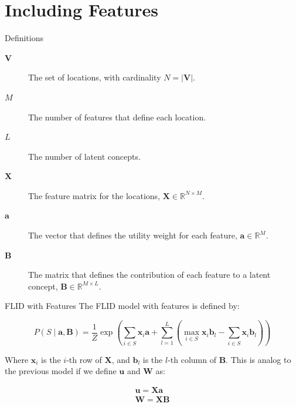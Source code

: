 \documentclass{beamer}
\begin{document}
  \section{Including Features}
  
  \begin{frame}{Definitions}
    \begin{description}
      \item[$\bm{V}$] The set of locations, with cardinality $N = \lvert \bm{V} \rvert$.
      \item[$M$] The number of features that define each location.
      \item[$L$] The number of latent concepts.
      \item[$\bm{X}$] The feature matrix for the locations, $\bm{X} \in \mathbb{R}^{N \times M}$.
      \item[$\bm{a}$] The vector that defines the utility weight for each feature, $\bm{a} \in \mathbb{R}^{M}$.
      \item[$\bm{B}$] The matrix that defines the contribution of each feature to a latent concept, $\bm{B} \in \mathbb{R}^{M \times L}$.
    \end{description}
  \end{frame}
  
  \begin{frame}{FLID with Features}
    The FLID model with features is defined by:
    
    \begin{equation}
      P(S \mid \bm{a}, \bm{B}) = \frac{1}{Z} \exp{\left(\sum_{i \in S}{\bm{x}_{i}\bm{a}} + \sum_{l = 1}^{L}{\left( \max_{i \in S}{\bm{x}_{i}\bm{b}_{l}} - \sum_{i \in S}{\bm{x}_{i}\bm{b}_{l}} \right)} \right)}
    \end{equation}
    
    Where $\bm{x}_{i}$ is the $i$-th row of $\bm{X}$, and $\bm{b}_{l}$ is the $l$-th column of $\bm{B}$. This is analog to the previous model if we define $\bm{u}$ and $\bm{W}$ as:
    
    \begin{eqnarray*}
       \bm{u} = \bm{X}\bm{a} \\
       \bm{W} = \bm{X}\bm{B}
    \end{eqnarray*}
  \end{frame}
  
\end{document}

